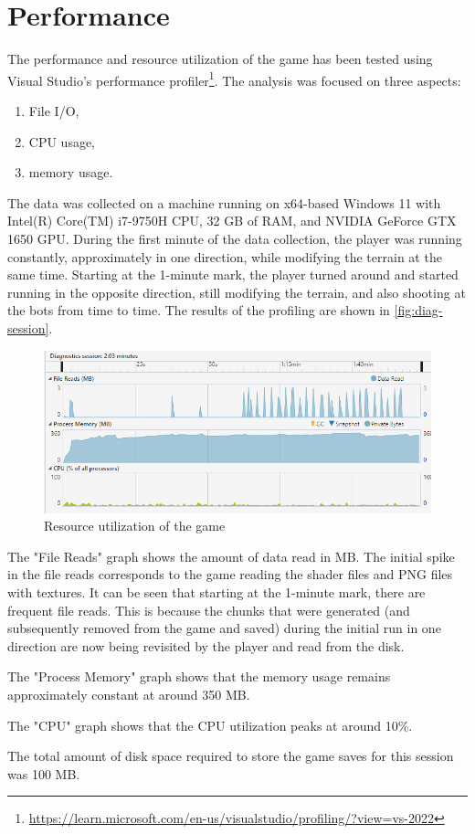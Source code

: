 \section{Performance}
The performance and resource utilization of the game has been tested using Visual Studio's performance profiler\footnote{\url{https://learn.microsoft.com/en-us/visualstudio/profiling/?view=vs-2022}}.
The analysis was focused on three aspects:
\begin{enumerate}
    \item File I/O,
    \item CPU usage,
    \item memory usage.
\end{enumerate}
The data was collected on a machine running on x64-based Windows 11 with Intel(R) Core(TM) i7-9750H CPU, 32 GB of RAM, and NVIDIA GeForce GTX 1650 GPU.
During the first minute of the data collection, the player was running constantly, approximately in one direction, while modifying the terrain at the same time.
Starting at the 1-minute mark, the player turned around and started running in the opposite direction, still modifying the terrain, and also shooting at the bots from time to time.
The results of the profiling are shown in \autoref{fig:diag-session}.
\begin{figure}[!htb]
    \centering
    \includegraphics[width=1\textwidth]{chapters/results/sections/performance/resources/diag-session.png}
    \caption{Resource utilization of the game}
    \label{fig:diag-session}
\end{figure}

The "File Reads" graph shows the amount of data read in MB.
The initial spike in the file reads corresponds to the game reading the shader files and PNG files with textures.
It can be seen that starting at the 1-minute mark, there are frequent file reads.
This is because the chunks that were generated (and subsequently removed from the game and saved) during the initial run in one direction are now being revisited by the player and read from the disk.

The "Process Memory" graph shows that the memory usage remains approximately constant at around 350 MB.

The "CPU" graph shows that the CPU utilization peaks at around 10\%.

The total amount of disk space required to store the game saves for this session was 100 MB.